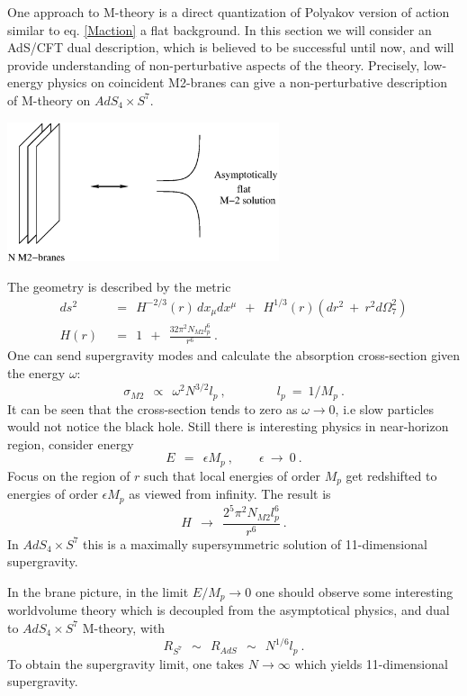 \documentclass[12pt]{article}
\begin{document}
One approach to M-theory is a direct quantization of Polyakov version of action similar to eq. \eqref{Maction} a flat background. 
In this section we will consider an AdS/CFT dual description, which is believed to be successful until now, and will provide understanding of non-perturbative aspects of 
the theory.
Precisely, low-energy physics on coincident M2-branes can give a non-perturbative description of M-theory on $ AdS_4 \times S^7 $.
\begin{center}
\includegraphics[width=8.0cm]{throat1.eps}
\end{center}
The geometry is described by the metric 
\begin{align*}
	ds^2 & ~~=~~ H^{-2/3}(r)\, dx_\mu dx^\mu ~~+~~ H^{1/3}(r) \left(dr^2 ~+~ r^2 d\Omega_7^2 \right) \\
	H(r) & ~~=~~ 1 ~~+~~ \frac{32\pi^2 N_{M2} l_p^6}{r^6}~.
\end{align*}
One can send supergravity modes and calculate the absorption cross-section given the energy $ \omega $:
\[
	\sigma_{M2} ~~\propto~~ \omega^2 N^{3/2} l_p~, \qquad\qquad l_p ~=~ 1/M_p~.
\]
It can be seen that the cross-section tends to zero as $ \omega \to 0 $, i.e slow particles would not notice the black hole.
Still there is interesting physics in near-horizon region, consider energy
\[
	E ~~=~~ \epsilon M_p~, \qquad  \epsilon ~\to~ 0~.
\]
Focus on the region of $ r $ such that local energies of order $ M_p $ get redshifted to energies of order $ \epsilon M_p $ as viewed
from infinity.
The result is 
\[
	H ~~\to~~ \frac{2^5 \pi^2 N_{M2} l_p^6}{r^6}~.
\]
In $ AdS_4 \times S^7 $ this is a maximally supersymmetric solution of 11-dimensional supergravity.

In the brane picture, in the limit $ E/M_p \to 0 $ one should observe some interesting worldvolume theory which is 
decoupled from the asymptotical physics, and dual to $ AdS_4 \times S^7 $ M-theory, with
\[
	R_{S^7} ~~\sim~~ R_{AdS} ~~\sim~~ N^{1/6} l_p~.
\]
To obtain the supergravity limit, one takes $ N \to \infty $ which yields 11-dimensional supergravity.
\end{document}

